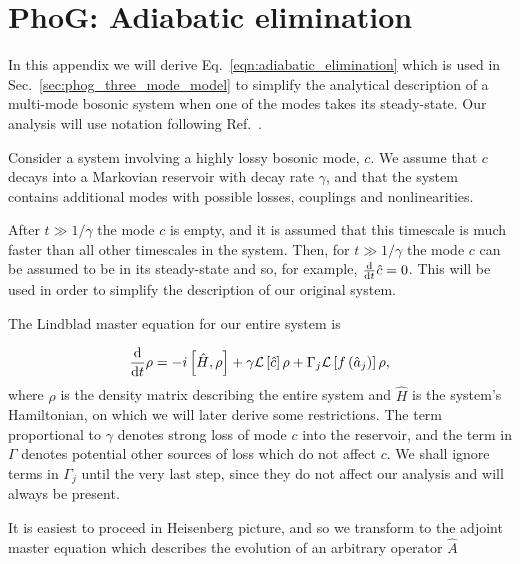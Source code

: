 %
%
%


\chapter{PhoG: Adiabatic elimination}\label{appendix:adiabatic_elimination}

In this appendix we will derive Eq.~\ref{eqn:adiabatic_elimination} which is used in Sec.~\ref{sec:phog_three_mode_model} to simplify the analytical description of a multi-mode bosonic system when one of the modes takes its steady-state. Our analysis will use notation following Ref.~\cite{Shchesnovich2011}. 

Consider a system involving a highly lossy bosonic mode, $c$. We assume that $c$ decays into a Markovian reservoir with decay rate $\gamma$, and that the system contains additional modes with possible losses, couplings and nonlinearities. 

After $t \gg 1/\gamma$ the mode $c$ is empty, and it is assumed that this timescale is much faster than all other timescales in the system. Then, for $t \gg 1/\gamma$ the mode $c$ can be assumed to be in its steady-state and so, for example, $\frac{\mathrm{d}}{\mathrm{d}t} \hat{c} = 0$. This will be used in order to simplify the description of our original system.

The Lindblad master equation for our entire system is

\begin{equation}
\frac{\mathrm{d}}{\mathrm{d}t} \rho = - i \left[ \hat{H}, \rho \right] + \gamma \mathcal{L}\left[\hat{c}\right] \rho + \Gamma_j\mathcal{L}\left[f\left(\hat{a}_j\right)\right] \rho,
\end{equation}
where $\rho$ is the density matrix describing the entire system and $\hat{H}$ is the system's Hamiltonian, on which we will later derive some restrictions. The term proportional to  $\gamma$ denotes strong loss of mode $c$ into the reservoir, and the term in $\Gamma$ denotes potential other sources of loss which do not affect $c$. We shall ignore terms in $\Gamma_j$ until the very last step, since they do not affect our analysis and will always be present.

It is easiest to proceed in Heisenberg picture, and so we transform to the adjoint master equation \cite{Breuer2002} which describes the evolution of an arbitrary operator $\hat{A}$

